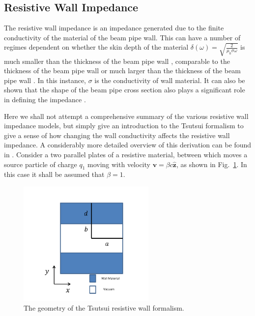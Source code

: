 \subsection{Resistive Wall Impedance}
\label{sec:res_wall_imp}

The resistive wall impedance is an impedance generated due to the finite conductivity of the material of the beam pipe wall. This can have a number of regimes dependent on whether the skin depth of the material $\delta \left( \omega \right) = \sqrt{\frac{2}{\mu_{0} \sigma \omega}}$ is much smaller than the thickness of the beam pipe wall \cite{Chao:PhysColEff}, comparable to the thickness of the beam pipe wall \cite{Roncarolo:ColImpMeas, Metral:ResWallWideFreq} or much larger than the thickness of the beam pipe wall \cite{Tsutsui:ferrKickLong, Biancacci:MMFiniteInsert}. In this instance, $\sigma$ is the conductivity of wall material. It can also be shown that the shape of the beam pipe cross section also plays a significant role in defining the impedance \cite{Mounet:Axisymmetric, Mounet:Flat}.

Here we shall not attempt a comprehensive summary of the various resistive wall impedance models, but simply give an introduction to the Tsutsui formalism to give a sense of how changing the wall conductivity affects the resistive wall impedance. A considerably more detailed overview of this derivation can be found in \cite{Tsutsui:ferrKickLong, Tsutsui:DipoleKicker}. Consider a two parallel plates of a resistive material, between which moves a source particle of charge $q_{1}$ moving with velocity $\mathbf{v} = \beta c \mathbf{\hat{z}}$, as shown in Fig.~\ref{fig:res_wall_diagram}. In this case it shall be assumed that $\beta = 1$.

\begin{figure}
\begin{center}
\includegraphics[width=0.6\textwidth]{Wakefields_and_Impedances/figures/reWallGeo.pdf}
\end{center}
\caption{The geometry of the Tsutsui resistive wall formalism.}
\label{fig:res_wall_diagram}
\end{figure}

